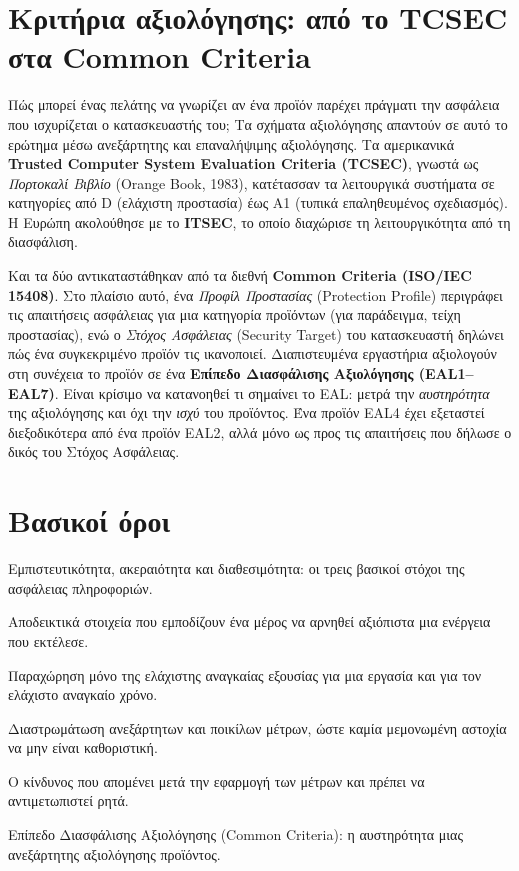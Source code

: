 \section{Κριτήρια αξιολόγησης: από το TCSEC στα Common Criteria}\label{sec:1.8}
Πώς μπορεί ένας πελάτης να γνωρίζει αν ένα προϊόν παρέχει πράγματι την ασφάλεια που ισχυρίζεται ο κατασκευαστής του; Τα σχήματα αξιολόγησης απαντούν σε αυτό το ερώτημα μέσω ανεξάρτητης και επαναλήψιμης αξιολόγησης. Τα αμερικανικά \textbf{Trusted Computer System Evaluation Criteria (TCSEC)}, γνωστά ως \emph{Πορτοκαλί Βιβλίο} (Orange Book, 1983), κατέτασσαν τα λειτουργικά συστήματα σε κατηγορίες από D (ελάχιστη προστασία) έως A1 (τυπικά επαληθευμένος σχεδιασμός). Η Ευρώπη ακολούθησε με το \textbf{ITSEC}, το οποίο διαχώρισε τη λειτουργικότητα από τη διασφάλιση.

Και τα δύο αντικαταστάθηκαν από τα διεθνή \textbf{Common Criteria (ISO/IEC 15408)}. Στο πλαίσιο αυτό, ένα \emph{Προφίλ Προστασίας} (Protection Profile) περιγράφει τις απαιτήσεις ασφάλειας για μια κατηγορία προϊόντων (για παράδειγμα, τείχη προστασίας), ενώ ο \emph{Στόχος Ασφάλειας} (Security Target) του κατασκευαστή δηλώνει πώς ένα συγκεκριμένο προϊόν τις ικανοποιεί. Διαπιστευμένα εργαστήρια αξιολογούν στη συνέχεια το προϊόν σε ένα \textbf{Επίπεδο Διασφάλισης Αξιολόγησης (EAL1–EAL7)}. Είναι κρίσιμο να κατανοηθεί τι σημαίνει το EAL: μετρά την \emph{αυστηρότητα} της αξιολόγησης και όχι την \emph{ισχύ} του προϊόντος. Ένα προϊόν EAL4 έχει εξεταστεί διεξοδικότερα από ένα προϊόν EAL2, αλλά μόνο ως προς τις απαιτήσεις που δήλωσε ο δικός του Στόχος Ασφάλειας.

\section*{Βασικοί όροι}
\begin{description}[style=nextline,leftmargin=1.2em]
  \item[Τριάδα CIA] Εμπιστευτικότητα, ακεραιότητα και διαθεσιμότητα: οι τρεις βασικοί στόχοι της ασφάλειας πληροφοριών.
  \item[Μη αποποίηση] Αποδεικτικά στοιχεία που εμποδίζουν ένα μέρος να αρνηθεί αξιόπιστα μια ενέργεια που εκτέλεσε.
  \item[Ελάχιστο προνόμιο] Παραχώρηση μόνο της ελάχιστης αναγκαίας εξουσίας για μια εργασία και για τον ελάχιστο αναγκαίο χρόνο.
  \item[Άμυνα σε βάθος] Διαστρωμάτωση ανεξάρτητων και ποικίλων μέτρων, ώστε καμία μεμονωμένη αστοχία να μην είναι καθοριστική.
  \item[Υπολειπόμενος κίνδυνος] Ο κίνδυνος που απομένει μετά την εφαρμογή των μέτρων και πρέπει να αντιμετωπιστεί ρητά.
  \item[EAL] Επίπεδο Διασφάλισης Αξιολόγησης (Common Criteria): η αυστηρότητα μιας ανεξάρτητης αξιολόγησης προϊόντος.
\end{description}

